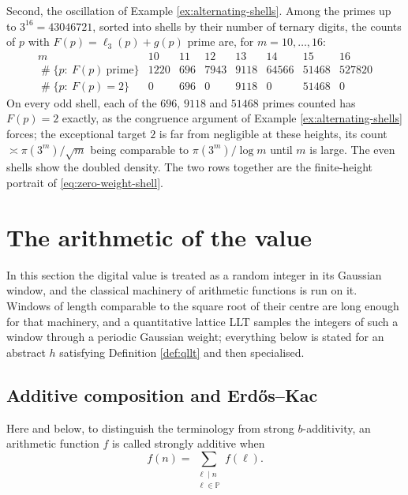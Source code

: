 \documentclass[11pt,reqno]{amsart}
\theoremstyle{plain}
\theoremstyle{definition}
\newcommand{\Pp}{\mathbb{P}}
\newcommand{\1}{\mathbf 1}
\DeclareMathOperator{\Card}{\#}
\begin{document}
Second, the oscillation of Example \ref{ex:alternating-shells}.  Among the primes up to $3^{16}=43046721$, sorted into shells by their number of ternary digits, the counts of $p$ with $F(p)=\ell_3(p)+g(p)$ prime are, for $m=10,\dots,16$:
\[
\begin{array}{c|ccccccc}
m&10&11&12&13&14&15&16\\
\hline
\Card\{p:\ F(p)\ \text{prime}\}&1220&696&7943&9118&64566&51468&527820\\
\Card\{p:\ F(p)=2\}&0&696&0&9118&0&51468&0
\end{array}
\]
On every odd shell, each of the $696$, $9118$ and $51468$ primes counted has $F(p)=2$ exactly, as the congruence argument of Example \ref{ex:alternating-shells} forces; the exceptional target $2$ is far from negligible at these heights, its count $\asymp\pi(3^m)/\sqrt m$ being comparable to $\pi(3^m)/\log m$ until $m$ is large.  The even shells show the doubled density.  The two rows together are the finite-height portrait of \eqref{eq:zero-weight-shell}.

\section{The arithmetic of the value}\label{sec:arithmetic}

In this section the digital value is treated as a random integer in its Gaussian window, and the classical machinery of arithmetic functions is run on it.  Windows of length comparable to the square root of their centre are long enough for that machinery, and a quantitative lattice LLT samples the integers of such a window through a periodic Gaussian weight; everything below is stated for an abstract $h$ satisfying Definition \ref{def:qllt} and then specialised.

\subsection{Additive composition and Erd\H{o}s--Kac}\label{sec:ek}

Here and below, to distinguish the terminology from strong $b$-additivity, an arithmetic function $f$ is called strongly additive when
\[
 f(n)=\sum_{\substack{\ell\mid n\\\ell\in\Pp}}f(\ell).
\]
\end{document}

